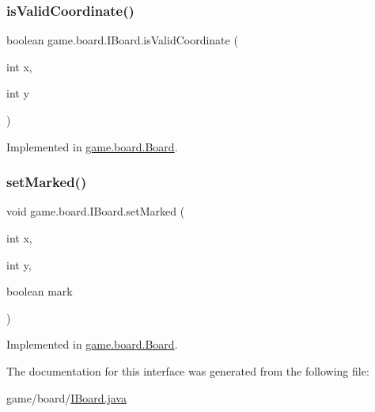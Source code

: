 \subsubsection{\texorpdfstring{is\+Valid\+Coordinate()}{isValidCoordinate()}}
{\footnotesize\ttfamily boolean game.\+board.\+I\+Board.\+is\+Valid\+Coordinate (\begin{DoxyParamCaption}\item[{int}]{x,  }\item[{int}]{y }\end{DoxyParamCaption})}



Implemented in \mbox{\hyperlink{classgame_1_1board_1_1_board_a02574586e2f8c3d6c4dd1672efdf0d68}{game.\+board.\+Board}}.

\mbox{\label{interfacegame_1_1board_1_1_i_board_a334f717410bd56a0112a70ce2a832c93}} 
\subsubsection{\texorpdfstring{set\+Marked()}{setMarked()}}
{\footnotesize\ttfamily void game.\+board.\+I\+Board.\+set\+Marked (\begin{DoxyParamCaption}\item[{int}]{x,  }\item[{int}]{y,  }\item[{boolean}]{mark }\end{DoxyParamCaption})}



Implemented in \mbox{\hyperlink{classgame_1_1board_1_1_board_a22008b95ac8e2754713eaebac4622ac4}{game.\+board.\+Board}}.



The documentation for this interface was generated from the following file\+:\begin{DoxyCompactItemize}
\item 
game/board/\mbox{\hyperlink{_i_board_8java}{I\+Board.\+java}}\end{DoxyCompactItemize}
